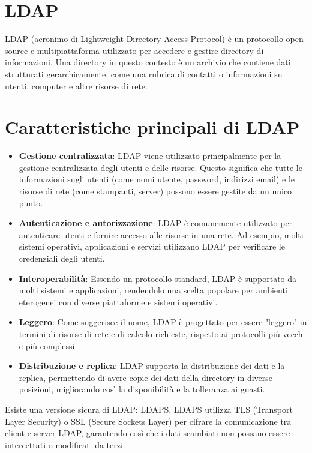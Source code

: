 \documentclass[12pt]{report}
\begin{document}
\section{LDAP}
LDAP (acronimo di Lightweight Directory Access Protocol) è un protocollo open-source e multipiattaforma utilizzato per accedere e gestire directory di informazioni. Una directory in questo contesto è un archivio che contiene dati strutturati gerarchicamente, come una rubrica di contatti o informazioni su utenti, computer e altre risorse di rete.
\section{Caratteristiche principali di LDAP}
\begin{itemize}
    \item \textbf{Gestione centralizzata}: LDAP viene utilizzato principalmente per la gestione centralizzata degli utenti e delle risorse. Questo significa che tutte le informazioni sugli utenti (come nomi utente, password, indirizzi email) e le risorse di rete (come stampanti, server) possono essere gestite da un unico punto.
    \item \textbf{Autenticazione e autorizzazione}: LDAP è comunemente utilizzato per autenticare utenti e fornire accesso alle risorse in una rete. Ad esempio, molti sistemi operativi, applicazioni e servizi utilizzano LDAP per verificare le credenziali degli utenti.
    \item \textbf{Interoperabilità}: Essendo un protocollo standard, LDAP è supportato da molti sistemi e applicazioni, rendendolo una scelta popolare per ambienti eterogenei con diverse piattaforme e sistemi operativi.
    \item \textbf{Leggero}: Come suggerisce il nome, LDAP è progettato per essere "leggero" in termini di risorse di rete e di calcolo richieste, rispetto ai protocolli più vecchi e più complessi.
    \item \textbf{Distribuzione e replica}: LDAP supporta la distribuzione dei dati e la replica, permettendo di avere copie dei dati della directory in diverse posizioni, migliorando così la disponibilità e la tolleranza ai guasti.
\end{itemize}
Esiste una versione sicura di LDAP: LDAPS. LDAPS utilizza TLS (Transport Layer Security) o SSL (Secure Sockets Layer) per cifrare la comunicazione tra client e server LDAP, garantendo così che i dati scambiati non possano essere intercettati o modificati da terzi.
\end{document}

